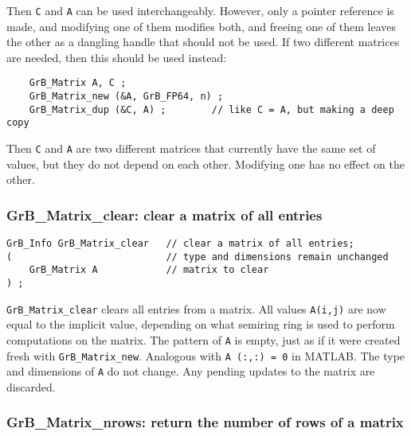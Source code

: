 \documentclass[12pt]{article}
\begin{document}
{Then \verb'C' and \verb'A' can be used interchangeably.  However, only a
pointer reference is made, and modifying one of them modifies both, and freeing
one of them leaves the other as a dangling handle that should not be used.  If
two different matrices are needed, then this should be used instead:

    {\footnotesize
    \begin{verbatim}
    GrB_Matrix A, C ;
    GrB_Matrix_new (&A, GrB_FP64, n) ;
    GrB_Matrix_dup (&C, A) ;        // like C = A, but making a deep copy \end{verbatim}}

Then \verb'C' and \verb'A' are two different matrices that currently have the
same set of values, but they do not depend on each other.  Modifying one has
no effect on the other.

\newpage
\subsubsection{{\sf GrB\_Matrix\_clear:}        clear a matrix of all entries}
\label{matrix_clear}

\begin{mdframed}[userdefinedwidth=6in]
{\footnotesize
\begin{verbatim}
GrB_Info GrB_Matrix_clear   // clear a matrix of all entries;
(                           // type and dimensions remain unchanged
    GrB_Matrix A            // matrix to clear
) ;
\end{verbatim} } \end{mdframed}

\verb'GrB_Matrix_clear' clears all entries from a matrix.  All values
\verb'A(i,j)' are now equal to the implicit value, depending on what semiring
ring is used to perform computations on the matrix.  The pattern of \verb'A' is
empty, just as if it were created fresh with \verb'GrB_Matrix_new'.  Analogous
with \verb'A (:,:) = 0' in MATLAB.  The type and dimensions of \verb'A' do not
change.  Any pending updates to the matrix are discarded.

\subsubsection{{\sf GrB\_Matrix\_nrows:}        return the number of rows of a matrix}
\label{matrix_nrows}

}
\end{document}
